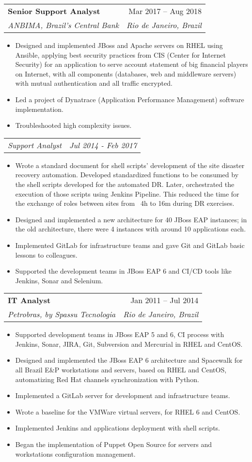 \documentclass[letterpaper,11pt]{article}
\makeatletter
\newcommand{\resumeItem}[1]{
  \item\small{
    {#1 \vspace{-2pt}}
  }
}
\newcommand{\resumeSubheading}[4]{
  \vspace{-2pt}\item
    \begin{tabular*}{0.97\textwidth}[t]{l@{\extracolsep{\fill}}r}
      \textbf{#1} & #2 \\
      \textit{\small#3} & \textit{\small #4} \\
    \end{tabular*}\vspace{-7pt}
}
\newcommand{\resumeSubSubheading}[2]{
    \item
    \begin{tabular*}{0.97\textwidth}{l@{\extracolsep{\fill}}r}
      \textit{\small#1} & \textit{\small #2} \\
    \end{tabular*}\vspace{-7pt}
}
\newcommand{\resumeItemListStart}{\begin{itemize}}
\newcommand{\resumeItemListEnd}{\end{itemize}\vspace{-5pt}}
\makeatother
\begin{document}
    \resumeSubheading
      {Senior Support Analyst}{Mar 2017 -- Aug 2018}
      {ANBIMA, Brazil's Central Bank}{Rio de Janeiro, Brazil}
      \resumeItemListStart
        \resumeItem{Designed and implemented JBoss and Apache servers on RHEL using Ansible, applying best security practices from CIS (Center for Internet Security) for an application to serve account statement of big financial players on Internet, with all components (databases, web and middleware servers) with mutual authentication and all traffic encrypted.}
        \resumeItem{Led a project of Dynatrace (Application Performance Management) software implementation.}
        \resumeItem{Troubleshooted high complexity issues.}
      \resumeItemListEnd

    \resumeSubSubheading
     {Support Analyst}{Jul 2014 - Feb 2017}
     \resumeItemListStart
       \resumeItem{Wrote a standard document for shell scripts' development of the site disaster recovery automation. Developed standardized functions to be consumed by the shell scripts developed for the automated DR. Later, orchestrated the execution of those scripts using Jenkins Pipeline. This reduced the time for the exchange of roles between sites from ~4h to 16m during DR exercises.}
       \resumeItem{Designed and implemented a new architecture for 40 JBoss EAP instances; in the old architecture, there were 4 instances with around 10 applications each.}
       \resumeItem{Implemented GitLab for infrastructure teams and gave Git and GitLab basic lessons to colleagues.}
       \resumeItem{Supported the development teams in JBoss EAP 6 and CI/CD tools like Jenkins, Sonar and Selenium.}
     \resumeItemListEnd

    \resumeSubheading
      {IT Analyst}{Jan 2011 -- Jul 2014}
      {Petrobras, by Spassu Tecnologia}{Rio de Janeiro, Brazil}
      \resumeItemListStart
        \resumeItem{Supported development teams in JBoss EAP 5 and 6, CI process with Jenkins, Sonar, JIRA, Git, Subversion and Mercurial in RHEL and CentOS.}
        \resumeItem{Designed and implemented the JBoss EAP 6 architecture and Spacewalk for all Brazil E\&P workstations and servers, based on RHEL and CentOS, automatizing Red Hat channels synchronization with Python.}
        \resumeItem{Implemented a GitLab server for development and infrastructure teams.}
        \resumeItem{Wrote a baseline for the VMWare virtual servers, for RHEL 6 and CentOS.}
        \resumeItem{Implemented Jenkins and applications deployment with shell scripts.}
        \resumeItem{Began the implementation of Puppet Open Source for servers and workstations configuration management.}
      \resumeItemListEnd
\end{document}
